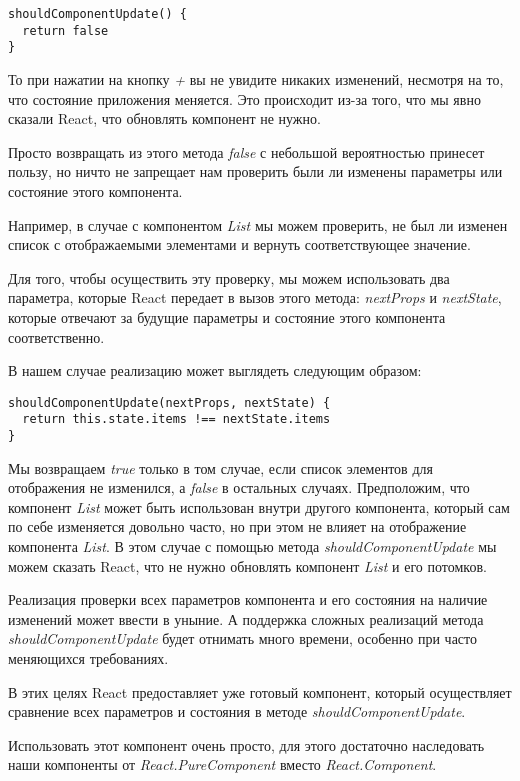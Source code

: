 \begin{lstlisting}
shouldComponentUpdate() {
  return false
}
\end{lstlisting}

То при нажатии на кнопку \textit{+} вы не увидите никаких изменений, несмотря на то, что состояние приложения меняется. Это происходит из-за того, что мы явно сказали React, что обновлять компонент не нужно.

Просто возвращать из этого метода \textit{false} с небольшой вероятностью принесет пользу, но ничто не запрещает нам проверить были ли изменены параметры или состояние этого компонента.

Например, в случае с компонентом \textit{List} мы можем проверить, не был ли изменен список с отображаемыми элементами и вернуть соответствующее значение.

Для того, чтобы осуществить эту проверку, мы можем использовать два параметра, которые React передает в вызов этого метода: \textit{nextProps} и \textit{nextState}, которые отвечают за будущие параметры и состояние этого компонента соответственно.

В нашем случае реализацию может выглядеть следующим образом:

\begin{lstlisting}
shouldComponentUpdate(nextProps, nextState) {
  return this.state.items !== nextState.items
}
\end{lstlisting}

Мы возвращаем \textit{true} только в том случае, если список элементов для отображения не изменился, а \textit{false} в остальных случаях. Предположим, что компонент \textit{List} может быть использован внутри другого компонента, который сам по себе изменяется довольно часто, но при этом не влияет на отображение компонента \textit{List}. В этом случае с помощью метода \textit{shouldComponentUpdate} мы можем сказать React, что не нужно обновлять компонент \textit{List} и его потомков.

Реализация проверки всех параметров компонента и его состояния на наличие изменений может ввести в уныние. А поддержка сложных реализаций метода \textit{shouldComponentUpdate} будет отнимать много времени, особенно при часто меняющихся требованиях.

В этих целях React предоставляет уже готовый компонент, который осуществляет сравнение всех параметров и состояния в методе \textit{shouldComponentUpdate}.

Использовать этот компонент очень просто, для этого достаточно наследовать наши компоненты от \textit{React.PureComponent} вместо \textit{React.Component}.


